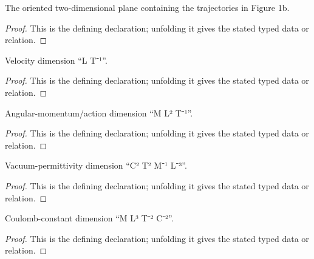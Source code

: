 \begin{definition}[Plane]
  \label{decl:physics:IPhO_2026_1_B_2:Plane}
  The oriented two-dimensional plane containing the trajectories in Figure 1b.
\end{definition}
\begin{proof}
  This is the defining declaration; unfolding it gives the stated typed data or relation.
\end{proof}

\begin{definition}[velocityDimension]
  \label{decl:physics:IPhO_2026_1_B_2:velocityDimension}
  Velocity dimension “L T⁻¹”.
\end{definition}
\begin{proof}
  This is the defining declaration; unfolding it gives the stated typed data or relation.
\end{proof}

\begin{definition}[angularMomentumDimension]
  \label{decl:physics:IPhO_2026_1_B_2:angularMomentumDimension}
  Angular-momentum/action dimension “M L² T⁻¹”.
\end{definition}
\begin{proof}
  This is the defining declaration; unfolding it gives the stated typed data or relation.
\end{proof}

\begin{definition}[permittivityDimension]
  \label{decl:physics:IPhO_2026_1_B_2:permittivityDimension}
  Vacuum-permittivity dimension “C² T² M⁻¹ L⁻³”.
\end{definition}
\begin{proof}
  This is the defining declaration; unfolding it gives the stated typed data or relation.
\end{proof}

\begin{definition}[coulombConstantDimension]
  \label{decl:physics:IPhO_2026_1_B_2:coulombConstantDimension}
  Coulomb-constant dimension “M L³ T⁻² C⁻²”.
\end{definition}
\begin{proof}
  This is the defining declaration; unfolding it gives the stated typed data or relation.
\end{proof}

